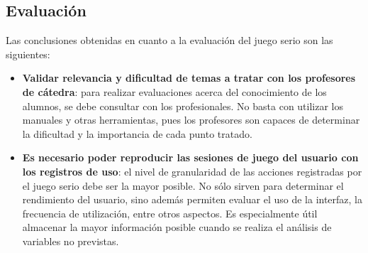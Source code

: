 \subsection{Evaluación}

Las conclusiones obtenidas en cuanto a la evaluación del juego serio son las  siguientes:

\begin{itemize}

\item \textbf{Validar relevancia y dificultad de temas a tratar con los profesores de cátedra}: para realizar evaluaciones acerca del conocimiento de los alumnos, se debe consultar con los profesionales. No basta con utilizar los manuales y otras herramientas, pues los profesores son capaces de determinar la dificultad y la importancia de cada punto tratado. 

\item \textbf{Es necesario poder reproducir las sesiones de juego del usuario con los registros de uso}: el nivel de granularidad de las acciones registradas por el juego serio debe ser la mayor posible. No sólo sirven para determinar el rendimiento del usuario, sino además permiten evaluar el uso de la interfaz, la frecuencia de utilización, entre otros aspectos. Es especialmente útil almacenar la mayor información posible cuando se realiza el análisis de variables no previstas. 


\end{itemize}
